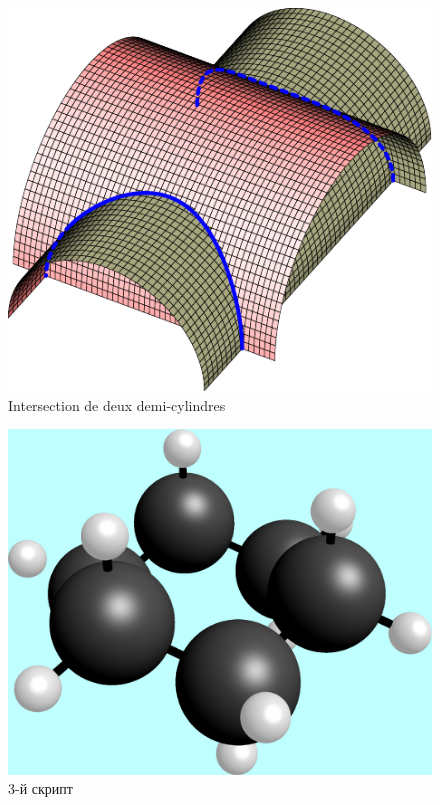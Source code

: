 \begin{figure}[h]
    \includegraphics{fig3-1.pdf}
    \centering
    \caption{Intersection de deux demi-cylindres}
\end{figure}

\begin{figure}[h]
    \includegraphics{script3}
    \centering
    \caption{3-й скрипт}
\end{figure}

